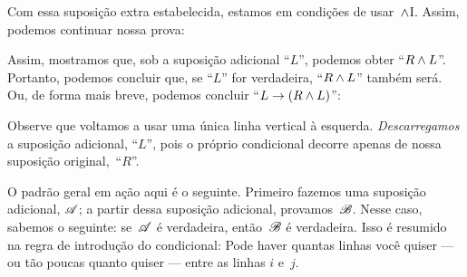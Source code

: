 Com essa suposição extra estabelecida, estamos em condições de
usar~$\wedge$I. Assim, podemos continuar nossa prova:
	\begin{fitchproof}
		\PR
		\open
			\AS
	\end{fitchproof}
Assim, mostramos que, sob a suposição adicional \textquotedblleft$L$\textquotedblright{}, podemos obter \textquotedblleft$R \wedge L$\textquotedblright{}. Portanto, podemos concluir que, se \textquotedblleft$L$\textquotedblright{} for verdadeira, \textquotedblleft$R \wedge L$\textquotedblright{} também será. Ou, de forma mais breve, podemos concluir \textquotedblleft$L \rightarrow (R \wedge L)$\textquotedblright{}:
	\begin{fitchproof}
		\hypo{r}{R}\PR
		\open
			\hypo{l}{L}\AS
			\ai{r, l}
			\close
		\ci{l-rl}
	\end{fitchproof}
Observe que voltamos a usar uma única linha vertical à esquerda. \emph{Descarregamos} a suposição adicional, \textquotedblleft$L$\textquotedblright{}, pois o próprio condicional decorre apenas de nossa suposição original,~\textquotedblleft$R$\textquotedblright{}.

O padrão geral em ação aqui é o seguinte. Primeiro fazemos uma suposição adicional, $\mathscr{A}$; a partir dessa suposição adicional, provamos~$\mathscr{B}$. Nesse caso, sabemos o seguinte: se~$\mathscr{A}$ é verdadeira, então~$\mathscr{B}$ é verdadeira. Isso é resumido na regra de introdução do condicional:
Pode haver quantas linhas você quiser — ou tão poucas quanto quiser — entre as linhas $i$
e~$j$.

